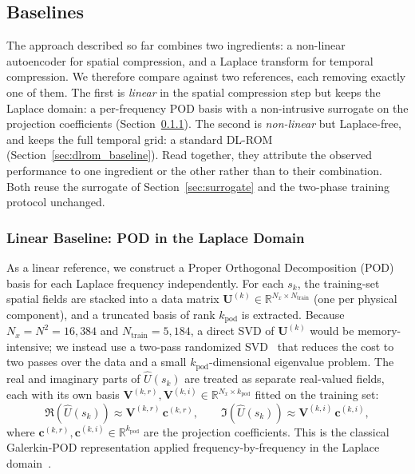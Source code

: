 ﻿\documentclass[a4paper,12pt]{article}
\theoremstyle{definition}
\theoremstyle{remark}
\newcommand{\R}{\mathbb{R}}
\begin{document}
\subsection{Baselines}
\label{sec:baselines}

The approach described so far combines two ingredients: a non-linear autoencoder for spatial compression, and a Laplace transform for temporal compression. We therefore compare against two references, each removing exactly one of them. The first is \emph{linear} in the spatial compression step but keeps the Laplace domain: a per-frequency POD basis with a non-intrusive surrogate on the projection coefficients (Section~\ref{sec:pod_baseline}). The second is \emph{non-linear} but Laplace-free, and keeps the full temporal grid: a standard DL-ROM (Section~\ref{sec:dlrom_baseline}). Read together, they attribute the observed performance to one ingredient or the other rather than to their combination. Both reuse the surrogate of Section~\ref{sec:surrogate} and the two-phase training protocol unchanged.

\subsubsection{Linear Baseline: POD in the Laplace Domain}
\label{sec:pod_baseline}

As a linear reference, we construct a Proper Orthogonal Decomposition (POD) basis for each Laplace frequency independently. For each $s_k$, the training-set spatial fields are stacked into a data matrix $\bm{U}^{(k)} \in \R^{N_x \times N_{\mathrm{train}}}$ (one per physical component), and a truncated basis of rank $k_{\mathrm{pod}}$ is extracted. Because $N_x = N^2 = 16{,}384$ and $N_{\mathrm{train}} = 5{,}184$, a direct SVD of $\bm{U}^{(k)}$ would be memory-intensive; we instead use a two-pass randomized SVD~\cite{halko2011} that reduces the cost to two passes over the data and a small $k_{\mathrm{pod}}$-dimensional eigenvalue problem. The real and imaginary parts of $\hat{U}(s_k)$ are treated as separate real-valued fields, each with its own basis $\bm{V}^{(k,r)}, \bm{V}^{(k,i)} \in \R^{N_x \times k_{\mathrm{pod}}}$ fitted on the training set:
\begin{equation}
    \Re(\hat{U}(s_k)) \approx \bm{V}^{(k,r)}\,\bm{c}^{(k,r)}, \qquad \Im(\hat{U}(s_k)) \approx \bm{V}^{(k,i)}\,\bm{c}^{(k,i)},
\end{equation}
where $\bm{c}^{(k,r)}, \bm{c}^{(k,i)} \in \R^{k_{\mathrm{pod}}}$ are the projection coefficients. This is the classical Galerkin-POD representation applied frequency-by-frequency in the Laplace domain~\cite{hesthaven2015}.
\end{document}
